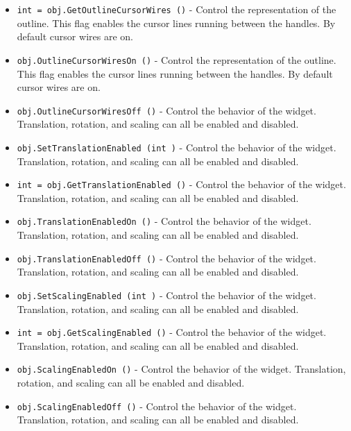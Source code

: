 \begin{itemize}
\item  \verb|int = obj.GetOutlineCursorWires ()| -  Control the representation of the outline. This flag enables
 the cursor lines running between the handles. By default cursor
 wires are on.

\item  \verb|obj.OutlineCursorWiresOn ()| -  Control the representation of the outline. This flag enables
 the cursor lines running between the handles. By default cursor
 wires are on.

\item  \verb|obj.OutlineCursorWiresOff ()| -  Control the behavior of the widget. Translation, rotation, and
 scaling can all be enabled and disabled.

\item  \verb|obj.SetTranslationEnabled (int )| -  Control the behavior of the widget. Translation, rotation, and
 scaling can all be enabled and disabled.

\item  \verb|int = obj.GetTranslationEnabled ()| -  Control the behavior of the widget. Translation, rotation, and
 scaling can all be enabled and disabled.

\item  \verb|obj.TranslationEnabledOn ()| -  Control the behavior of the widget. Translation, rotation, and
 scaling can all be enabled and disabled.

\item  \verb|obj.TranslationEnabledOff ()| -  Control the behavior of the widget. Translation, rotation, and
 scaling can all be enabled and disabled.

\item  \verb|obj.SetScalingEnabled (int )| -  Control the behavior of the widget. Translation, rotation, and
 scaling can all be enabled and disabled.

\item  \verb|int = obj.GetScalingEnabled ()| -  Control the behavior of the widget. Translation, rotation, and
 scaling can all be enabled and disabled.

\item  \verb|obj.ScalingEnabledOn ()| -  Control the behavior of the widget. Translation, rotation, and
 scaling can all be enabled and disabled.

\item  \verb|obj.ScalingEnabledOff ()| -  Control the behavior of the widget. Translation, rotation, and
 scaling can all be enabled and disabled.


\end{itemize}
